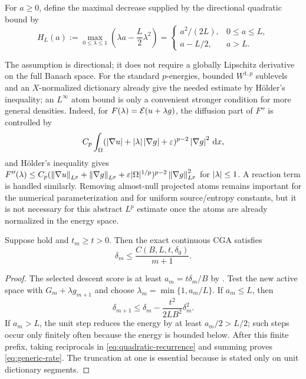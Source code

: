 For $a\geq0$, define the maximal decrease supplied by the directional quadratic
bound by
\[
 H_L(a):=\max_{0\leq\lambda\leq1}
       \left(\lambda a-\frac L2\lambda^2\right)
 =\begin{cases}a^2/(2L),&0\leq a\leq L,\\
                 a-L/2,&a>L.
   \end{cases}
\]

The assumption is directional; it does not require a globally Lipschitz derivative on the full Banach
space. For the standard \(p\)-energies, bounded \(W^{1,p}\) sublevels and an \(X\)-normalized dictionary
already give the needed estimate by H\"older's inequality; an \(L^\infty\) atom bound is only a
convenient stronger condition for more general densities. Indeed, for
\(F(\lambda)=\mathcal{E}(u+\lambda g)\), the diffusion part of \(F''\) is controlled by
\[
 C_p\int_\Omega(\left\lvert \nabla u\right\rvert+\left\lvert \lambda\right\rvert\left\lvert \nabla g\right\rvert+\varepsilon)^{p-2}
 \left\lvert \nabla g\right\rvert^2\,\mathrm{d} x,
\]
and H\"older's inequality gives
\(F''(\lambda)\leq C_p(\left\lVert \nabla u\right\rVert_{L^p}+\left\lVert \nabla g\right\rVert_{L^p}+\varepsilon|\Omega|^{1/p})^{p-2}
\left\lVert \nabla g\right\rVert_{L^p}^2\) for \(\left\lvert \lambda\right\rvert\leq1\). A reaction term is handled similarly. Removing
almost-null projected atoms remains important for the numerical parameterization and for uniform
source/entropy constants, but it is not necessary for this abstract \(L^p\) estimate once the atoms are
already normalized in the energy space.

\begin{theorem}
\label{thm:generic}
Suppose  hold and \(t_m\geq t>0\). Then the exact continuous CGA
satisfies
\begin{equation}
  \delta_m\leq \frac{C(B,L,t,\delta_0)}{m+1}.
\label{eq:generic-rate}
\end{equation}
\end{theorem}

\begin{proof}
The selected descent score is at least \(a_m=t\delta_m/B\) by . Test the new
active space with \(G_m+\lambda g_{m+1}\) and choose
\(\lambda_m=\min\{1,a_m/L\}\). If \(a_m\leq L\), then
\begin{equation}
 \delta_{m+1}\leq\delta_m-\frac{t^2}{2LB^2}\delta_m^2.
\label{eq:quadratic-recurrence}
\end{equation}
If \(a_m>L\), the unit step reduces the energy by at least \(a_m/2>L/2\); such steps occur only
finitely often because the energy is bounded below. After this finite prefix, taking reciprocals in
\cref{eq:quadratic-recurrence} and summing proves \cref{eq:generic-rate}. The truncation at one is
essential because  is stated only on unit dictionary segments.
\end{proof}

